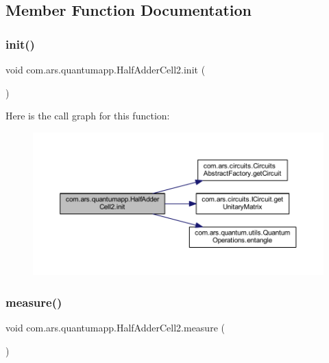 \subsection{Member Function Documentation}
\hypertarget{classcom_1_1ars_1_1quantumapp_1_1_half_adder_cell2_a9962ffb8cd54b25f0c696e7c06882195}{}\label{classcom_1_1ars_1_1quantumapp_1_1_half_adder_cell2_a9962ffb8cd54b25f0c696e7c06882195} 
\subsubsection{\texorpdfstring{init()}{init()}}
{\footnotesize\ttfamily void com.\+ars.\+quantumapp.\+Half\+Adder\+Cell2.\+init (\begin{DoxyParamCaption}{ }\end{DoxyParamCaption})}

Here is the call graph for this function\+:
\nopagebreak
\begin{figure}[H]
\begin{center}
\leavevmode
\includegraphics[width=350pt]{classcom_1_1ars_1_1quantumapp_1_1_half_adder_cell2_a9962ffb8cd54b25f0c696e7c06882195_cgraph}
\end{center}
\end{figure}
\hypertarget{classcom_1_1ars_1_1quantumapp_1_1_half_adder_cell2_ace7018ecff35605ac317049d2584db13}{}\label{classcom_1_1ars_1_1quantumapp_1_1_half_adder_cell2_ace7018ecff35605ac317049d2584db13} 
\subsubsection{\texorpdfstring{measure()}{measure()}}
{\footnotesize\ttfamily void com.\+ars.\+quantumapp.\+Half\+Adder\+Cell2.\+measure (\begin{DoxyParamCaption}{ }\end{DoxyParamCaption})}

